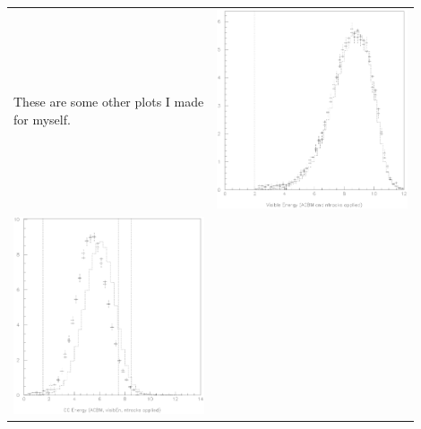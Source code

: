 \documentclass{article}
\begin{document}
\pagebreak
\begin{center}
  \begin{tabular}{p{0.45\linewidth} p{0.45\linewidth}}
    \begin{minipage}{\linewidth}
      \Huge These are some other plots I made for myself.
    \end{minipage} &
    \begin{minipage}{\linewidth}
      \includegraphics[width=\linewidth]{visiben.eps}
    \end{minipage} \\
    \begin{minipage}{\linewidth}
      \includegraphics[width=\linewidth]{ccen.eps}

\end{minipage}
\end{tabular}
\end{center}
\end{document}
